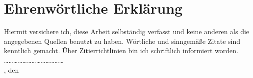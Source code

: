 \section*{Ehrenwörtliche Erklärung}
Hiermit versichere ich, diese Arbeit selbständig verfasst und keine anderen als die
angegebenen Quellen benutzt zu haben. Wörtliche und sinngemäße Zitate sind
kenntlich gemacht. Über Zitierrichtlinien bin ich schriftlich informiert worden.\\[1.5cm]
\ldots\ldots\ldots\ldots\ldots\ldots\ldots\ldots\ldots\ldots\ldots\ldots\ldots\\
\submissionLocation, den \submissionDate